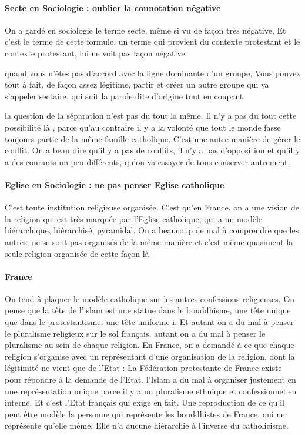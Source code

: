  \paragraph{Secte en Sociologie : oublier la connotation négative}
On a gardé en sociologie le terme secte, même si  vu de façon très négative, 
Et c'est le terme de cette formule, un terme qui provient du contexte protestant et le contexte protestant, lui ne voit pas façon négative.
 \begin{Ex}
      quand vous n'êtes pas d'accord avec la ligne dominante d'un groupe, Vous pouvez tout à  fait, de façon assez légitime, partir et créer un autre groupe qui va s'appeler sectaire, qui suit la parole dite d'origine tout en coupant.
    
 \end{Ex}
 \begin{Ex}
   la question de la séparation n'est pas du tout la même.
Il n'y a pas du tout cette possibilité là , parce qu'au contraire il y a la volonté que tout le monde fasse toujours partie de la même famille catholique. C'est une autre manière de gérer le conflit. On a beau dire qu'il y a pas de conflits, il n'y a pas d'opposition et qu'il y a des courants un peu différents, qu'on va essayer de tous conserver autrement.
 \end{Ex}
 \paragraph{Eglise en Sociologie : ne pas penser Eglise catholique} 
C'est toute institution religieuse organisée. C'est qu'en France, on a une vision de la religion qui est très marquée par l'Eglise catholique, qui a un modèle hiérarchique, hiérarchisé, pyramidal. On a beaucoup de mal à  comprendre que les autres, ne se sont pas organisés de la même manière et c'est même quasiment la seule religion organisée de cette façon là.

\paragraph{France}
On tend à plaquer le modèle catholique sur les autres confessions religieuses. On pense que la tête de l'islam est une statue dans le bouddhisme, une tête unique que dans le protestantisme, une tête uniforme i.  Et autant on a du mal à  penser le pluralisme religieux sur le sol français, autant on a du mal à  penser le pluralisme au sein de chaque religion. En France, on a demandé à  ce que chaque religion s'organise avec un représentant d'une organisation de la religion, dont la légitimité ne vient que de l'Etat : La Fédération protestante de France existe pour répondre à  la demande de l'Etat. l'Islam a du mal à  organiser justement en une représentation unique parce il y a un pluralisme ethnique et confessionnel en interne.
Et c'est l'Etat français qui exige en fait.
Une reproduction de ce qu'il peut être modèle la personne qui représente les bouddhistes de France, qui ne représente qu'elle même. Elle n'a aucune hiérarchie à l'inverse du catholicisme. 

